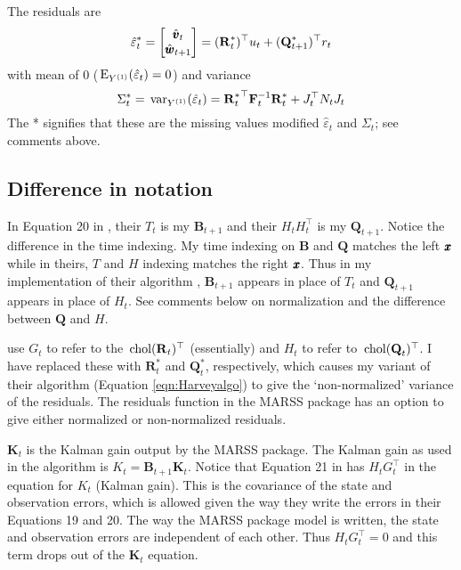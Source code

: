 \documentclass[]{article}
\def\UPS{\mbox{\boldmath $\Upsilon$}}
\def\BB{\mbox{$\mathbf B$}}	\def\bb{\mbox{$\mathbf b$}} \def\Bb{\mbox{$\mathbf J$}} \def\Ba{\mbox{$\mathbf L$}} \def\Bm{\UPS}
\def\E{\,\textup{\textrm{E}}}
\def\FF{\mbox{$\mathbf F$}} \def\ff{\mbox{$\mathbf f$}}
\def\KK{\mbox{$\mathbf K$}}
\def\QQ{\mbox{$\mathbf Q$}}	 \def\qq{\mbox{$\mathbf q$}} \def\Qb{\mbox{$\mathbf G$}}  \def\Qm{\mathbb{Q}}
\def\RR{\mbox{$\mathbf R$}}	 \def\rr{\mbox{$\mathbf r$}} \def\Rb{\mbox{$\mathbf H$}}	\def\Rm{\mathbb{R}}
\def\chol{\,\textup{\textrm{chol}}}
\def\var{\,\textup{\textrm{var}}}
\begin{document}
The residuals \citep[eqn 24]{Harveyetal1998} are
\begin{equation}\label{eqn:Harveyresiduals}
\hat{\varepsilon}^*_t = \begin{bmatrix}\hat{\vv}_t\\ \hat{\ww}_{t+1}\end{bmatrix} =({\RR^*_t})^\top u_t + ({\QQ^*_{t+1}})^\top r_t
\end{equation}
with mean of 0 ($\E_{Y^{(1)}}(\hat{\varepsilon}_t)=0$) and variance
\begin{equation}\label{eqn:Harveyvariance}
\Sigma_t^* = \var_{Y^{(1)}}(\hat{\varepsilon}_t) ={\RR^*_t}^\top \FF_t^{-1} \RR^*_t + J_t^\top N_t J_t
\end{equation}
The * signifies that these are the missing values modified $\hat{\varepsilon}_t$ and $\Sigma_t$; see comments above.

\subsection{Difference in notation}
In Equation 20 in \citet{Harveyetal1998}, their $T_t$ is my $\BB_{t+1}$ and their $H_t H_t^\top$ is my $\QQ_{t+1}$.  Notice the difference in the time indexing. My time indexing on $\BB$ and $\QQ$ matches the left $\mbox{$\pmb{x}$}$ while in theirs, $T$ and $H$ indexing matches the right $\mbox{$\pmb{x}$}$. Thus in my implementation of their algorithm \citep[eqns. 21-24]{Harveyetal1998}, $\BB_{t+1}$ appears in place of $T_t$ and $\QQ_{t+1}$ appears in place of $H_t$. See comments below on normalization and the difference between $\QQ$ and $H$. 

\citet[eqns. 19, 20]{Harveyetal1998} use $G_t$ to refer to the $\chol(\RR_t)^\top$ (essentially) and $H_t$ to refer to $\chol(\QQ_t)^\top$.  I have replaced these with $\RR_t^*$ and $\QQ_t^*$, respectively, which causes my variant of their algorithm (Equation \ref{eqn:Harveyalgo}) to give the `non-normalized' variance of the residuals. The residuals function in the MARSS package has an option to give either normalized or non-normalized residuals.

$\KK_t$ is the Kalman gain output by the MARSS package.  The Kalman gain as used in the \citet{Harveyetal1998} algorithm is $K_t=\BB_{t+1}\KK_t$. Notice that Equation 21 in \citet{Harveyetal1998} has $H_t G_t^\top$ in the equation for $K_t$ (Kalman gain). This is the covariance of the state and observation errors, which is allowed given the way they write the errors in their Equations 19 and 20. The way the MARSS package model is written, the state and observation errors are independent of each other. Thus $H_t G_t^\top = 0$ and this term drops out of the $\KK_t$ equation.
\end{document}
